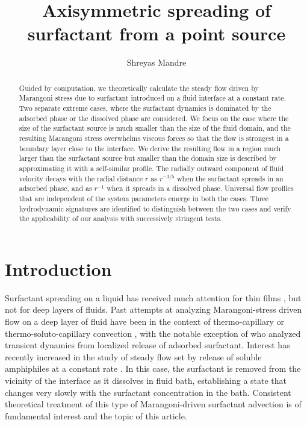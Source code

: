 \documentclass[]{jfm}
\begin{document}
 
\title{Axisymmetric spreading of surfactant from a point source}
\author{Shreyas Mandre}
\maketitle
\begin{abstract}
Guided by computation, we theoretically calculate the steady flow driven by Marangoni stress due to surfactant introduced on a fluid interface at a constant rate.
Two separate extreme cases, where the surfactant dynamics is dominated by the adsorbed phase or the dissolved phase are considered.
We focus on the case where the size of the surfactant source is much smaller than the size of the fluid domain, and the resulting Marangoni stress overwhelms viscous forces so that the flow is strongest in a boundary layer close to the interface.
We derive the resulting flow in a region much larger than the surfactant source but smaller than the domain size is described by approximating it with a self-similar profile.
The radially outward component of fluid velocity decays with the radial distance $r$ as $r^{-3/5}$ when the surfactant spreads in an adsorbed phase, and as $r^{-1}$ when it spreads in a dissolved phase.
Universal flow profiles that are independent of the system parameters emerge in both the cases.
Three hydrodynamic signatures are identified to distinguish between the two cases and verify the applicability of our analysis with successively stringent tests.
\end{abstract}

\section{Introduction}
Surfactant spreading on a liquid has received much attention for thin films \citep{Craster2009}, but not for deep layers of fluids.
Past attempts at analyzing Marangoni-stress driven flow on a deep layer of fluid have been in the context of thermo-capillary \citep*[][e.g.]{Bratukhin1967,Napolitano1979,Zebib1985,Carpenter1990} or thermo-soluto-capillary convection \citep{Bratukhin1968}, with the notable exception of \cite{Jensen1995} who analyzed transient dynamics from localized release of adsorbed surfactant. 
Interest has recently increased in the study of steady flow set by release of soluble amphiphiles at a constant rate \citep*{Roche2014,LeRoux2016}.
In this case, the surfactant is removed from the vicinity of the interface as it dissolves in fluid bath, establishing a state that changes very slowly with the surfactant concentration in the bath.
Consistent theoretical treatment of this type of Marangoni-driven surfactant advection is of fundamental interest and the topic of this article. 
\end{document}
